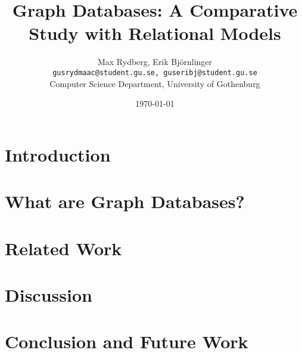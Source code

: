 \documentclass[12pt, a4paper]{article}
\title{Graph Databases: A Comparative Study with Relational Models}
\author{
  Max Rydberg, Erik Björnlinger \\
  \texttt{gusrydmaac@student.gu.se, guseribj@student.gu.se} \\
  Computer Science Department, University of Gothenburg 
}
\date{\today}
\begin{document}
\maketitle

\begin{abstract}

\end{abstract}

\section{Introduction}


\section{What are Graph Databases?}






\section{Related Work}


\section{Discussion}


\section{Conclusion and Future Work}

\end{document}
